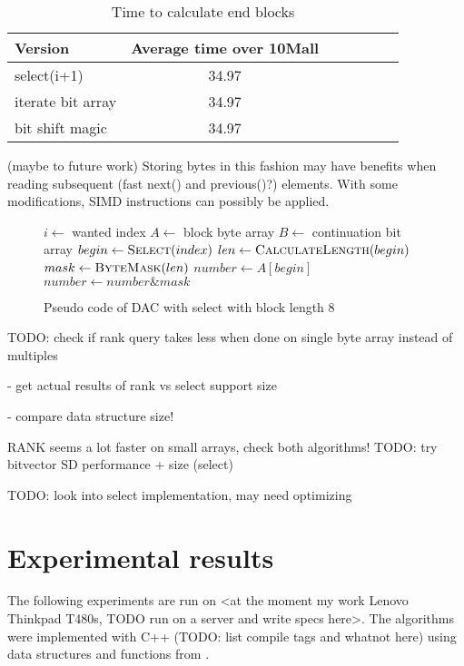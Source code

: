 \begin{table}
\centering
\caption{Time to calculate end blocks}
\begin{tabular}{l||c c c c c c} 
Version & Average time over 10Mall \\ 
\hline \hline 
select(i+1) & 34.97 \\
iterate bit array & 34.97 \\
bit shift magic & 34.97 \\
\hline
%
\end{tabular}
\label{endblockcall}
\end{table}

(maybe to future work) Storing bytes in this fashion may have benefits when reading subsequent (fast next() and previous()?) elements. With some modifications, SIMD instructions can possibly be applied.

\begin{figure}[ht]
\begin{algorithmic}
\State $i \gets $ wanted index
\State $A \gets $ block byte array
\State $B \gets $ continuation bit array
\State $begin \gets \Call{Select}{index}$
\State $len \gets \Call{CalculateLength}{begin}$
\State $mask \gets \Call{ByteMask}{len}$
\State $number \gets A[begin]$ 
\State $number \gets number \mathbin{\&} mask$ 


\end{algorithmic}
\caption{Pseudo code of DAC with select with block length 8} \label{select_pseudo}
\end{figure}

TODO: check if rank query takes less when done on single byte array instead of multiples

 - get actual results of rank vs select support size


 - compare data structure size!

     RANK seems a lot faster on small arrays, check both algorithms!
TODO: try bitvector SD performance + size (select)

TODO: look into select implementation, may need optimizing

\chapter{Experimental results}

The following experiments are run on <at the moment my work Lenovo Thinkpad T480s, TODO run on a server and write specs here>. The algorithms 
were implemented with C++ (TODO: list compile tags and whatnot here) using data structures and functions from \citep{gbmp2014sea}. 



